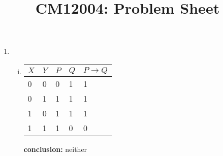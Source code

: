\documentclass{article}
\title{CM12004: Problem Sheet}
\author{} %
\date{} %
\begin{document}
\maketitle

\begin{enumerate}
  \item
  \begin{enumerate}[(i)]
    \item %
          \begin{tabular}{|l|l|l|l|l|}
            \hline
            $X$ & $Y$ & $P$ & $Q$ & $P\to Q$\\ \hline
            0&0&0&1&1\\
            0&1&1&1&1\\
            1&0&1&1&1\\
            1&1&1&0&0\\ \hline
          \end{tabular}
          \textbf{conclusion:} neither


\end{enumerate}
\end{enumerate}
\end{document}

